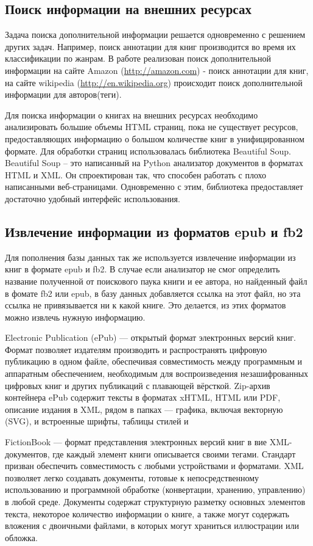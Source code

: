 \documentclass[a4paper]{report}
\begin{document}
\subsection{Поиск информации на внешних ресурсах}

Задача поиска дополнительной информации решается одновременно с решением других задач. Например, поиск аннотации для книг производится во время их классификации по жанрам.
В работе реализован поиск дополнительной информации на сайте Amazon (\url {http://amazon.com}) - поиск аннотации для книг, на сайте wikipedia (\url {http://en.wikipedia.org}) происходит поиск дополнительной информации для авторов(теги).

Для поиска информации о книгах на внешних ресурсах необходимо анализировать большие объемы HTML страниц, \tk пока не существует ресурсов, предоставляющих информацию о большом количестве книг в унифицированном формате. Для обработки страниц использовалась библиотека Beautiful Soup. Beautiful Soup -- это написанный на Python анализатор документов в форматах HTML и XML. Он спроектирован так, что способен работать с плохо написанными  веб-страницами. Одновременно с этим, библиотека предоставляет достаточно удобный интерфейс использования.

\subsection{Извлечение информации из форматов epub и fb2}

Для пополнения базы данных так же используется извлечение информации из книг в формате epub и fb2. В случае если анализатор не смог определить название полученной от поискового паука книги и ее автора, но найденный файл в фомате fb2 или epub, в базу данных добавляется ссылка на этот файл, но эта ссылка не привязывается ни к какой книге. Это делается, \tk из этих форматов можно извлечь нужную информацию. 

Electronic Publication (ePub) — открытый формат электронных версий книг. Формат позволяет издателям производить и распространять цифровую публикацию в одном файле, обеспечивая совместимость между программным и аппаратным обеспечением, необходимым для воспроизведения незашифрованных цифровых книг и других публикаций с плавающей вёрсткой.
Zip-архив контейнера ePub содержит тексты в форматах xHTML, HTML или PDF, описание издания в XML, рядом в папках — графика, включая векторную (SVG), и встроенные шрифты, таблицы стилей и \td 

FictionBook — формат представления электронных версий книг в вие XML-документов, где каждый элемент книги описывается своими тегами. Стандарт призван обеспечить совместимость с любыми устройствами и форматами. XML позволяет легко создавать документы, готовые к непосредственному использованию и программной обработке (конвертации, хранению, управлению) в любой среде. Документы содержат структурную разметку основных элементов текста, некоторое количество информации о книге, а также могут содержать вложения с двоичными файлами, в которых могут храниться иллюстрации или обложка.
\end{document}
